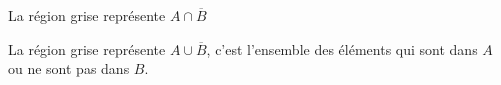 \documentclass[main.tex]{subfiles}
\begin{document}
\noindent
\parbox{0.32\linewidth}{
La région grise représente	\og $A\cap \overline{B}$\fg{}
} 
\parbox{0.18\linewidth}{
	\begin{venndiagram2sets}[tikzoptions={scale=0.6,thick}]
		\fillOnlyA
		\setpostvennhook
		{
		}
	\end{venndiagram2sets} 
}
\hfill 
\parbox{0.3\linewidth}{
La région grise représente	\og $A\cup \overline{B}$\fg{}, c'est l'ensemble des éléments qui sont dans $A$ ou ne sont pas dans $B$.
}
\parbox{0.18\linewidth}{
	\begin{venndiagram2sets}[tikzoptions={scale=0.6,thick}]
		\fillA \fillNotB 
		\setpostvennhook
		{
		}
	\end{venndiagram2sets} 
} 
\end{document}
